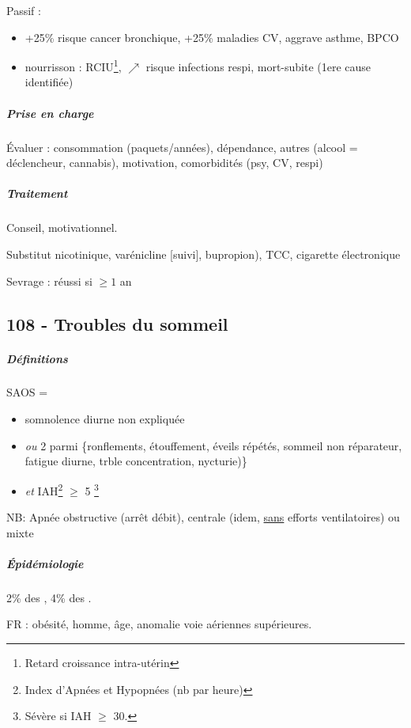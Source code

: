 \documentclass[11pt]{article}
\begin{document}
Passif :
\begin{itemize}
\item +25\% risque cancer bronchique, +25\% maladies CV, aggrave asthme, BPCO
\item nourrisson : RCIU\footnote{Retard croissance intra-utérin}, \(\nearrow\) risque
infections respi, mort-subite (1ere cause identifiée)
\end{itemize}

\subparagraph{Prise en charge}
\label{sec:org1193584}
Évaluer : consommation (paquets/années), dépendance, autres (alcool = déclencheur,
cannabis), motivation, comorbidités (psy, CV, respi)
\subparagraph{Traitement}
\label{sec:orgff13cbc}
Conseil, motivationnel.

Substitut nicotinique, varénicline [\danger suivi], bupropion), TCC, cigarette électronique

Sevrage : réussi si \(\ge 1\) an

\subsection{108 - Troubles du sommeil}
\label{sec:orga3fe3b8}
\subparagraph{Définitions}
\label{sec:org874127b}
SAOS =
\begin{itemize}
\item somnolence diurne non expliquée
\item \emph{ou} 2 parmi \{ronflements, étouffement, éveils répétés, sommeil non réparateur, fatigue diurne, trble concentration, nycturie)\}
\item \emph{et} IAH\footnote{Index d'Apnées et Hypopnées (nb par heure)} \(\ge\) 5 \footnote{Sévère si IAH \(\ge\) 30.}
\end{itemize}
NB: Apnée obstructive (arrêt débit), centrale (idem, \uline{sans} efforts ventilatoires) ou mixte

\subparagraph{Épidémiologie}
\label{sec:org49de324}
2\% des \female, 4\% des \male.

FR : obésité, homme, âge, anomalie voie aériennes supérieures. 
\end{document}
